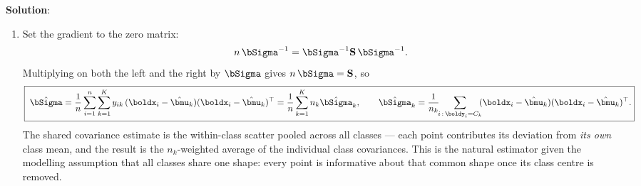 \documentclass[submit]{../harvardml}
\newenvironment{solution}{
    \vspace{2mm}
    \color{blue}\noindent\textbf{Solution}:
}{}
\begin{document}
\begin{solution}
\begin{enumerate}
\item
Set the gradient to the zero matrix:
\[
  n\,\bSigma^{-1} = \bSigma^{-1}\mathbf S\,\bSigma^{-1}.
\]
Multiplying on both the left and the right by $\bSigma$ gives $n\,\bSigma = \mathbf S$, so
\[
  \boxed{\;
  \hat\bSigma
  = \frac{1}{n}\sum_{i=1}^{n}\sum_{k=1}^{K} y_{ik}\,(\boldx_i - \hat\bmu_k)(\boldx_i - \hat\bmu_k)^\top
  = \frac{1}{n}\sum_{k=1}^{K} n_k \hat\bSigma_k,
  \qquad
  \hat\bSigma_k = \frac{1}{n_k}\!\!\sum_{i\,:\,\boldy_i = C_k}\!\! (\boldx_i-\hat\bmu_k)(\boldx_i-\hat\bmu_k)^\top .}
\]
The shared covariance estimate is the within-class scatter pooled across all classes
--- each point contributes its deviation from \emph{its own} class mean, and the
result is the $n_k$-weighted average of the individual class covariances. This is the
natural estimator given the modelling assumption that all classes share one shape:
every point is informative about that common shape once its class centre is removed.

\end{enumerate}
\end{solution}
\end{document}
